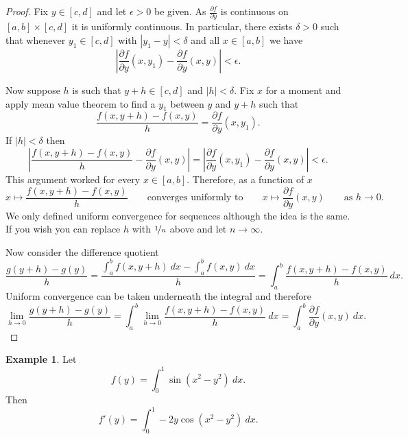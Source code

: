 \documentclass[12pt]{book}
\newcommand{\abs}[1]{\left\lvert {#1} \right\rvert}
\theoremstyle{plain}
\theoremstyle{remark}
\theoremstyle{definition}
\theoremstyle{exercise}
\theoremstyle{example}
\newtheorem{example}[thm]{Example}
\begin{document}
\begin{proof}
Fix $y \in [c,d]$ and let $\epsilon > 0$ be given.
As $\frac{\partial f}{\partial y}$ is continuous on $[a,b] \times [c,d]$ it
is uniformly continuous.  In particular, there exists $\delta > 0$ such that
whenever $y_1 \in [c,d]$ with
$\abs{y_1-y} < \delta$ and all $x \in [a,b]$ we have
\begin{equation*}
\abs{\frac{\partial f}{\partial y}(x,y_1)-\frac{\partial f}{\partial y}(x,y)} < \epsilon .
\end{equation*}

Now suppose $h$ is such that $y+h \in [c,d]$ and $\abs{h} < \delta$.
Fix $x$ for a moment
and apply mean value theorem to find a $y_1$ between $y$ and $y+h$ such that
\begin{equation*}
\frac{f(x,y+h)-f(x,y)}{h}
=
\frac{\partial f}{\partial y}(x,y_1) .
\end{equation*}
If $\abs{h} < \delta$ then
\begin{equation*}
\abs{
\frac{f(x,y+h)-f(x,y)}{h}
-
\frac{\partial f}{\partial y}(x,y) 
}
=
\abs{
\frac{\partial f}{\partial y}(x,y_1) 
-
\frac{\partial f}{\partial y}(x,y) 
}
< \epsilon .
\end{equation*}
This argument worked for every $x \in [a,b]$.  Therefore, as a function of
$x$
\begin{equation*}
x \mapsto \frac{f(x,y+h)-f(x,y)}{h}
\qquad
\text{converges uniformly to}
\qquad
x \mapsto \frac{\partial f}{\partial y}(x,y)
\qquad
\text{as $h \to 0$} .
\end{equation*}
We only defined uniform convergence for sequences although the idea is the
same.  If you wish you can replace $h$ with $\nicefrac{1}{n}$ above and let
$n \to \infty$.

Now consider the difference quotient
\begin{equation*}
\frac{g(y+h)-g(y)}{h}
=
\frac{\int_a^b f(x,y+h) ~dx -
\int_a^b f(x,y) ~dx }{h}
=
\int_a^b \frac{f(x,y+h)-f(x,y)}{h} ~dx .
\end{equation*}
Uniform convergence can be taken underneath the integral and therefore
\begin{equation*}
\lim_{h\to 0}
\frac{g(y+h)-g(y)}{h}
= 
\int_a^b 
\lim_{h\to 0}
\frac{f(x,y+h)-f(x,y)}{h} ~dx 
=
\int_a^b 
\frac{\partial f}{\partial y}(x,y) ~dx .
\end{equation*}
\end{proof}

\begin{example}
Let
\begin{equation*}
f(y) = \int_0^1 \sin(x^2-y^2) ~dx .
\end{equation*}
Then
\begin{equation*}
f'(y) = \int_0^1 -2y\cos(x^2-y^2) ~dx .
\end{equation*}
\end{example}
\end{document}
